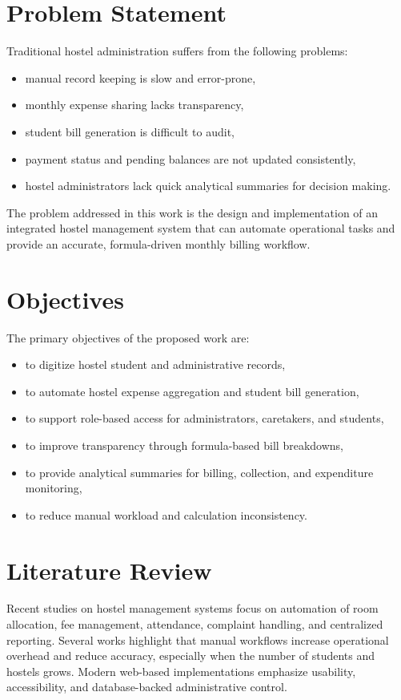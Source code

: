 \documentclass[conference]{IEEEtran}
\begin{document}
\section{Problem Statement}
Traditional hostel administration suffers from the following problems:
\begin{itemize}
\item manual record keeping is slow and error-prone,
\item monthly expense sharing lacks transparency,
\item student bill generation is difficult to audit,
\item payment status and pending balances are not updated consistently,
\item hostel administrators lack quick analytical summaries for decision making.
\end{itemize}

The problem addressed in this work is the design and implementation of an integrated hostel management system that can automate operational tasks and provide an accurate, formula-driven monthly billing workflow.

\section{Objectives}
The primary objectives of the proposed work are:
\begin{itemize}
\item to digitize hostel student and administrative records,
\item to automate hostel expense aggregation and student bill generation,
\item to support role-based access for administrators, caretakers, and students,
\item to improve transparency through formula-based bill breakdowns,
\item to provide analytical summaries for billing, collection, and expenditure monitoring,
\item to reduce manual workload and calculation inconsistency.
\end{itemize}

\section{Literature Review}
Recent studies on hostel management systems focus on automation of room allocation, fee management, attendance, complaint handling, and centralized reporting. Several works highlight that manual workflows increase operational overhead and reduce accuracy, especially when the number of students and hostels grows. Modern web-based implementations emphasize usability, accessibility, and database-backed administrative control.
\end{document}
